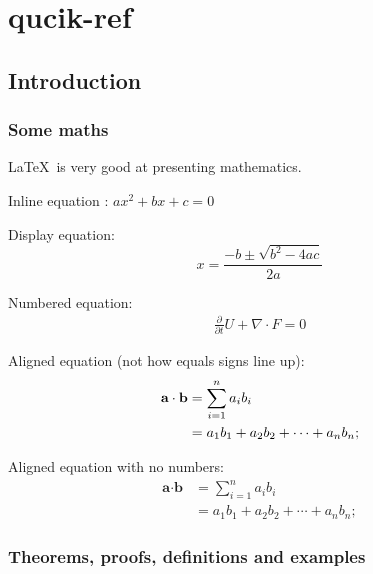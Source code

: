
\chapter*{qucik-ref}

\section{Introduction}

\subsection{Some maths}


\LaTeX\ is very good at presenting mathematics.

Inline equation :
$ax^2 + bx + c = 0$ %

Display equation:
$$x = \frac{-b \pm \sqrt{b^2 - 4ac}}{2a}$$ %

Numbered equation:
\begin{align}
    \label{eq:equation label} %
    \frac{\partial}{\partial t} U + \nabla \cdot F = 0
\end{align}

Aligned equation (not how equals signs line up):
\begin{align}
    \notag %
    \label{eq:dot product}
    \textbf{a} \cdot \textbf{b} & = \sum_{i=1}^n a_ib_i                \\
                                & = a_1b_1 + a_2b_2 + \cdots + a_nb_n; %
\end{align}

Aligned equation with no numbers:
\begin{align*} %
    \label{eq:dot product}
    \textbf{a} \cdot \textbf{b} & = \sum_{i=1}^n a_ib_i                \\
                                & = a_1b_1 + a_2b_2 + \cdots + a_nb_n;
\end{align*}

\subsection{Theorems, proofs, definitions and examples}

